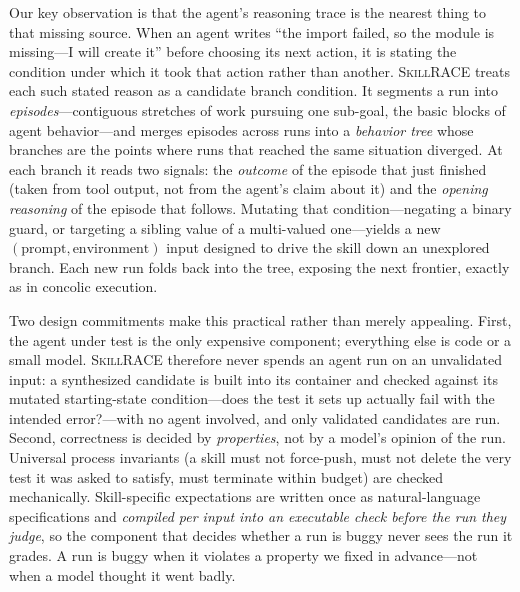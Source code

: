 \documentclass[acmsmall,screen,review,anonymous]{acmart}
\newcommand{\tool}{\textsc{SkillRACE}\xspace}
\begin{document}
Our key observation is that the agent's reasoning trace is the nearest thing to that
missing source. When an agent writes ``the import failed, so the module is missing---I
will create it'' before choosing its next action, it is stating the condition under
which it took that action rather than another. \tool treats each such stated reason as
a candidate branch condition. It segments a run into \emph{episodes}---contiguous
stretches of work pursuing one sub-goal, the basic blocks of agent behavior---and
merges episodes across runs into a \emph{behavior tree} whose branches are the points
where runs that reached the same situation diverged. At each branch it reads two
signals: the \emph{outcome} of the episode that just finished (taken from tool output,
not from the agent's claim about it) and the \emph{opening reasoning} of the episode
that follows. Mutating that condition---negating a binary guard, or targeting a
sibling value of a multi-valued one---yields a new \((\text{prompt},\text{environment})\)
input designed to drive the skill down an unexplored branch. Each new run folds back
into the tree, exposing the next frontier, exactly as in concolic execution.

Two design commitments make this practical rather than merely appealing. First, the
agent under test is the only expensive component; everything else is code or a small
model. \tool therefore never spends an agent run on an unvalidated input: a synthesized
candidate is built into its container and checked against its mutated starting-state
condition---does the test it sets up actually fail with the intended error?---with no agent involved,
and only validated candidates are run. Second, correctness is decided by
\emph{properties}, not by a model's opinion of the run. Universal process invariants
(a skill must not force-push, must not delete the very test it was asked to satisfy,
must terminate within budget) are checked mechanically. Skill-specific expectations
are written once as natural-language specifications and \emph{compiled per input into
an executable check before the run they judge}, so the component that decides whether
a run is buggy never sees the run it grades. A run is buggy when it violates a property
we fixed in advance---not when a model thought it went badly.
\end{document}
